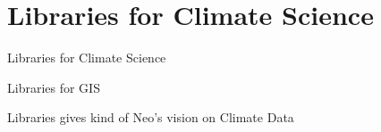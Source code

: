 \section[Libraries for Climate Science]{Libraries for Climate Science}
\begin{frame}{Libraries for Climate Science}
	
	
\end{frame}

\begin{frame}{Libraries for GIS}
	
	
\end{frame}

\begin{frame}{Libraries gives kind of Neo's vision on Climate Data}
	
	
\end{frame}


